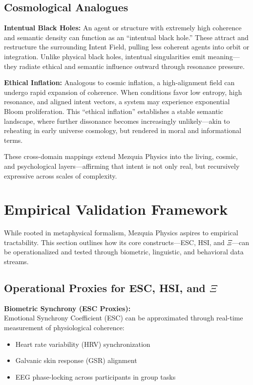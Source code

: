 \documentclass[12pt]{article}
\begin{document}
\subsection{Cosmological Analogues}

\textbf{Intentual Black Holes:} An agent or structure with extremely high coherence and semantic density can function as an “intentual black hole.” These attract and restructure the surrounding Intent Field, pulling less coherent agents into orbit or integration. Unlike physical black holes, intentual singularities emit meaning—they radiate ethical and semantic influence outward through resonance pressure.

\textbf{Ethical Inflation:} Analogous to cosmic inflation, a high-alignment field can undergo rapid expansion of coherence. When conditions favor low entropy, high resonance, and aligned intent vectors, a system may experience exponential Bloom proliferation. This “ethical inflation” establishes a stable semantic landscape, where further dissonance becomes increasingly unlikely—akin to reheating in early universe cosmology, but rendered in moral and informational terms.

These cross-domain mappings extend Mezquia Physics into the living, cosmic, and psychological layers—affirming that intent is not only real, but recursively expressive across scales of complexity.

\section{Empirical Validation Framework}

While rooted in metaphysical formalism, Mezquia Physics aspires to empirical tractability. This section outlines how its core constructs—ESC, HSI, and \(\Xi\)—can be operationalized and tested through biometric, linguistic, and behavioral data streams.

\subsection{Operational Proxies for ESC, HSI, and \(\Xi\)}

\textbf{Biometric Synchrony (ESC Proxies):} \\
Emotional Synchrony Coefficient (ESC) can be approximated through real-time measurement of physiological coherence:
\begin{itemize}
  \item Heart rate variability (HRV) synchronization
  \item Galvanic skin response (GSR) alignment
  \item EEG phase-locking across participants in group tasks
\end{itemize}
\end{document}
